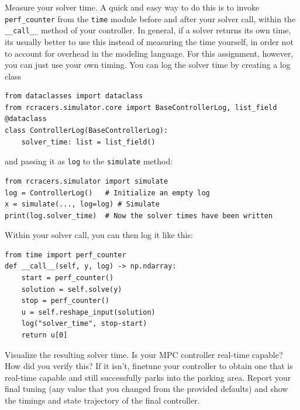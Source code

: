 \documentclass[]{article}
\begin{document}
\begin{assignment}
	Measure your solver time. A quick and easy way to do this is to invoke \texttt{perf\_counter} 
	from the \texttt{time} module before and after your solver call, within the \texttt{\_\_call\_\_} 
	method of your controller. In general, if a solver returns its own time, its usually better to use this instead of measuring the time yourself, in order 
	not to account for overhead in the modeling language. For this assignment, however, you can just use your own timing.
	You can log the solver time by 
	creating a log class 
	\begin{lstlisting}[style=python]
from dataclasses import dataclass
from rcracers.simulator.core import BaseControllerLog, list_field
@dataclass
class ControllerLog(BaseControllerLog): 
    solver_time: list = list_field()
	\end{lstlisting}
	and passing it as \texttt{log} to the \texttt{simulate} method:
	\begin{lstlisting}[style=python]
from rcracers.simulator import simulate
log = ControllerLog()   # Initialize an empty log 
x = simulate(..., log=log) # Simulate 
print(log.solver_time)  # Now the solver times have been written 
	\end{lstlisting}
	Within your solver call, you can then log it like this:
	\begin{lstlisting}[style=python]
from time import perf_counter
def __call__(self, y, log) -> np.ndarray:
	start = perf_counter()
	solution = self.solve(y)
	stop = perf_counter()
	u = self.reshape_input(solution)
	log("solver_time", stop-start)
	return u[0]
	\end{lstlisting}
	Visualize the resulting solver time. Is your MPC controller real-time capable? How did you verify this? If it isn't, finetune your controller to 
	obtain one that is real-time capable and still successfully parks into the parking area.
	Report your final tuning (any value that you changed from the provided defaults)
	and show the timings and state trajectory of the final controller.
\end{assignment}


\newpage
\end{document}
